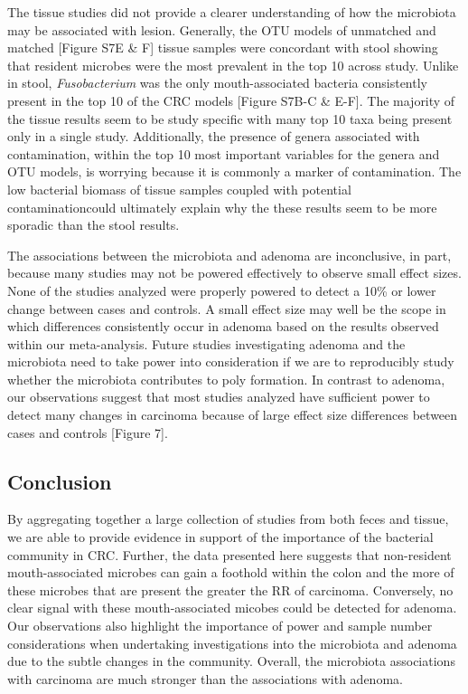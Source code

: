 \documentclass[12pt,]{article}
\begin{document}
The tissue studies did not provide a clearer understanding of how the
microbiota may be associated with lesion. Generally, the OTU models of
unmatched and matched {[}Figure S7E \& F{]} tissue samples were
concordant with stool showing that resident microbes were the most
prevalent in the top 10 across study. Unlike in stool,
\emph{Fusobacterium} was the only mouth-associated bacteria consistently
present in the top 10 of the CRC models {[}Figure S7B-C \& E-F{]}. The
majority of the tissue results seem to be study specific with many top
10 taxa being present only in a single study. Additionally, the presence
of genera associated with contamination, within the top 10 most
important variables for the genera and OTU models, is worrying because
it is commonly a marker of contamination. The low bacterial biomass of
tissue samples coupled with potential contaminationcould ultimately
explain why the these results seem to be more sporadic than the stool
results.

The associations between the microbiota and adenoma are inconclusive, in
part, because many studies may not be powered effectively to observe
small effect sizes. None of the studies analyzed were properly powered
to detect a 10\% or lower change between cases and controls. A small
effect size may well be the scope in which differences consistently
occur in adenoma based on the results observed within our meta-analysis.
Future studies investigating adenoma and the microbiota need to take
power into consideration if we are to reproducibly study whether the
microbiota contributes to poly formation. In contrast to adenoma, our
observations suggest that most studies analyzed have sufficient power to
detect many changes in carcinoma because of large effect size
differences between cases and controls {[}Figure 7{]}.

\newpage

\subsection{Conclusion}\label{conclusion}

By aggregating together a large collection of studies from both feces
and tissue, we are able to provide evidence in support of the importance
of the bacterial community in CRC. Further, the data presented here
suggests that non-resident mouth-associated microbes can gain a foothold
within the colon and the more of these microbes that are present the
greater the RR of carcinoma. Conversely, no clear signal with these
mouth-associated micobes could be detected for adenoma. Our observations
also highlight the importance of power and sample number considerations
when undertaking investigations into the microbiota and adenoma due to
the subtle changes in the community. Overall, the microbiota
associations with carcinoma are much stronger than the associations with
adenoma.
\end{document}
